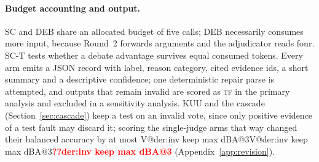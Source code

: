 \documentclass[pdflatex,iicol,sn-mathphys-num]{sn-jnl}
\makeatletter
\newcommand{\V}[1]{\ifcsname V@#1\endcsname\csname V@#1\endcsname\else\textbf{\textcolor{red}{??#1}}\fi}
\newcommand{\TF}{\textsc{tf}}
\makeatother
\begin{document}
\paragraph{Budget accounting and output.} SC and DEB share an allocated budget of five calls; DEB necessarily consumes more input, because Round~2 forwards arguments and the adjudicator reads four. SC-T tests whether a debate advantage survives equal consumed tokens. Every arm emits a JSON record with label, reason category, cited evidence ids, a short summary and a descriptive confidence; one deterministic repair parse is attempted, and outputs that remain invalid are scored as \TF{} in the primary analysis and excluded in a sensitivity analysis. KUU and the cascade (Section~\ref{sec:cascade}) keep a test on an invalid vote, since only positive evidence of a test fault may discard it; scoring the single-judge arms that way changed their balanced accuracy by at most \V{der:inv keep max dBA@3} (Appendix~\ref{app:revision}).
\end{document}
